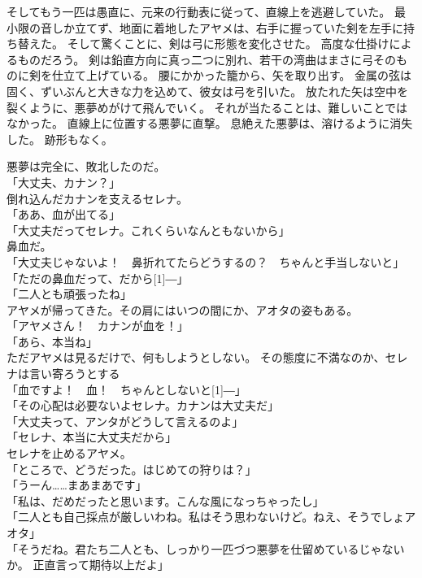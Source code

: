 \documentclass[../IHMain]{subfiles}
\begin{document}
そしてもう一匹は愚直に、元来の行動表に従って、直線上を逃避していた。
最小限の音しか立てず、地面に着地したアヤメは、右手に握っていた剣を左手に持ち替えた。
そして驚くことに、剣は弓に形態を変化させた。
高度な仕掛けによるものだろう。
剣は鉛直方向に真っ二つに別れ、若干の湾曲はまさに弓そのものに剣を仕立て上げている。
腰にかかった籠から、矢を取り出す。
金属の弦は固く、ずいぶんと大きな力を込めて、彼女は弓を引いた。
放たれた矢は空中を裂くように、悪夢めがけて飛んでいく。
それが当たることは、難しいことではなかった。
直線上に位置する悪夢に直撃。
息絶えた悪夢は、溶けるように消失した。
跡形もなく。

悪夢は完全に、敗北したのだ。\\

「大丈夫、カナン？」\\
倒れ込んだカナンを支えるセレナ。\\
「ああ、血が出てる」\\
「大丈夫だってセレナ。これくらいなんともないから」\\
鼻血だ。\\
「大丈夫じゃないよ！　鼻折れてたらどうするの？　ちゃんと手当しないと」\\
「ただの鼻血だって、だから\scalebox{3}[1]{―}」\\
「二人とも頑張ったね」\\
アヤメが帰ってきた。その肩にはいつの間にか、アオタの姿もある。\\
「アヤメさん！　カナンが血を！」\\
「あら、本当ね」\\
ただアヤメは見るだけで、何もしようとしない。
その態度に不満なのか、セレナは言い寄ろうとする\\
「血ですよ！　血！　ちゃんとしないと\scalebox{3}[1]{―}」\\
「その心配は必要ないよセレナ。カナンは大丈夫だ」\\
「大丈夫って、アンタがどうして言えるのよ」\\
「セレナ、本当に大丈夫だから」\\
セレナを止めるアヤメ。\\
「ところで、どうだった。はじめての狩りは？」\\
「うーん……まあまあです」\\
「私は、だめだったと思います。こんな風になっちゃったし」\\
「二人とも自己採点が厳しいわね。私はそう思わないけど。ねえ、そうでしょアオタ」\\
「そうだね。君たち二人とも、しっかり一匹づつ悪夢を仕留めているじゃないか。
正直言って期待以上だよ」\\
\end{document}

